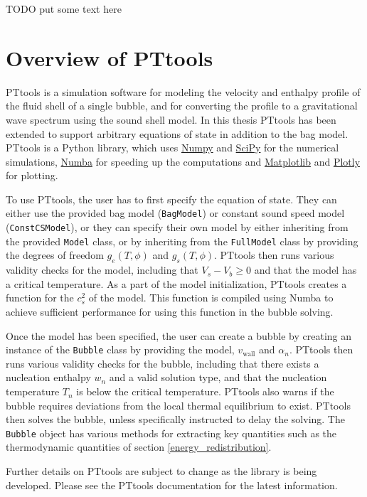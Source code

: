 TODO put some text here


\section{Overview of PTtools}
PTtools is a simulation software for modeling the velocity and enthalpy profile of the fluid shell of a single bubble,
and for converting the profile to a gravitational wave spectrum using the sound shell model.
In this thesis PTtools has been extended to support arbitrary equations of state in addition to the bag model.
PTtools is a Python library, which uses
\href{https://numpy.org/}{Numpy}
and
\href{https://scipy.org/}{SciPy}
for the numerical simulations,
\href{https://numba.pydata.org/}{Numba}
for speeding up the computations and
\href{https://matplotlib.org/}{Matplotlib}
and
\href{https://plotly.com/}{Plotly}
for plotting.

To use PTtools, the user has to first specify the equation of state.
They can either use the provided bag model (\texttt{BagModel}) or constant sound speed model (\texttt{ConstCSModel}),
or they can specify their own model by either inheriting from the provided \texttt{Model} class,
or by inheriting from the \texttt{FullModel} class by providing the degrees of freedom $g_e(T,\phi)$ and $g_s(T,\phi)$.
PTtools then runs various validity checks for the model,
including that $V_s - V_b \geq 0$ and that the model has a critical temperature.
As a part of the model initialization, PTtools creates a function for the $c_s^2$ of the model.
This function is compiled using Numba to achieve sufficient performance for using this function in the bubble solving.

Once the model has been specified,
the user can create a bubble by creating an instance of the \texttt{Bubble} class by providing the model, $v_\text{wall}$ and $\alpha_n$.
PTtools then runs various validity checks for the bubble,
including that there exists a nucleation enthalpy $w_n$ and a valid solution type,
and that the nucleation temperature $T_n$ is below the critical temperature.
PTtools also warns if the bubble requires deviations from the local thermal equilibrium to exist.
PTtools then solves the bubble, unless specifically instructed to delay the solving.
The \texttt{Bubble} object has various methods for extracting key quantities such as the thermodynamic quantities of section \ref{energy_redistribution}.

Further details on PTtools are subject to change as the library is being developed.
Please see the PTtools documentation for the latest information.

